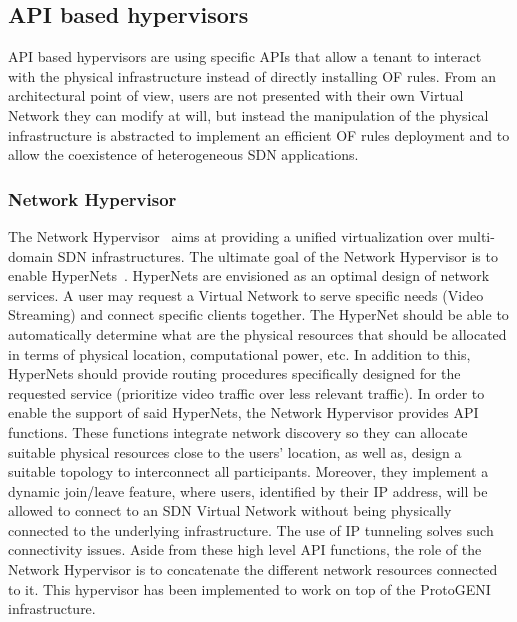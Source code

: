 \subsection{API based hypervisors}
API based hypervisors are using specific APIs that allow a tenant to interact with the physical infrastructure instead of directly installing OF rules.
From an architectural point of view, users are not presented with their own Virtual Network they can modify at will, but instead the manipulation of the physical infrastructure is abstracted to implement an efficient OF rules deployment and to allow the coexistence of heterogeneous SDN applications.


\subsubsection{Network Hypervisor}
The Network Hypervisor~\cite{NetworkHypervisor-Huang2013} aims at providing a unified virtualization over multi-domain SDN infrastructures. 
The ultimate goal of the Network Hypervisor is to enable HyperNets~\cite{HyperNet-Huang2013a}. HyperNets are envisioned as an optimal design of network services. A user may request a Virtual Network to serve specific needs (\eg Video Streaming) and connect specific clients together.
The HyperNet should be able to automatically determine what are the physical resources that should be allocated in terms of physical location, computational power, etc. In addition to this, HyperNets should provide routing procedures specifically designed for the requested service (\ie prioritize video traffic over less relevant traffic).
In order to enable the support of said HyperNets, the Network Hypervisor provides API functions. These functions integrate network discovery so they can allocate suitable physical resources close to the users' location, as well as, design a suitable topology to interconnect all participants.
Moreover, they implement a dynamic join/leave feature, where users, identified by their IP address, will be allowed to connect to an SDN Virtual Network without being physically connected to the underlying infrastructure. The use of IP tunneling solves such connectivity issues.
Aside from these high level API functions, the role of the Network Hypervisor is to concatenate the different network resources connected to it.
This hypervisor has been implemented to work on top of the ProtoGENI~\cite{protoGENI} infrastructure.


